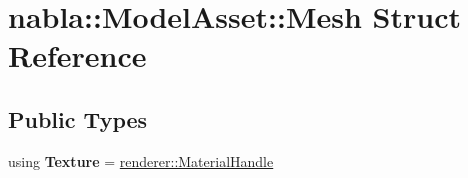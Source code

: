 \hypertarget{structnabla_1_1_model_asset_1_1_mesh}{}\section{nabla\+::Model\+Asset\+::Mesh Struct Reference}
\label{structnabla_1_1_model_asset_1_1_mesh}
\subsection*{Public Types}
\begin{DoxyCompactItemize}
\item 
\mbox{\label{structnabla_1_1_model_asset_1_1_mesh_a3ce9411186b0dee12a1751382de1d87d}} 
using {\bfseries Texture} = \mbox{\hyperlink{classnabla_1_1renderer_1_1_handle}{renderer\+::\+Material\+Handle}}
\end{DoxyCompactItemize}
